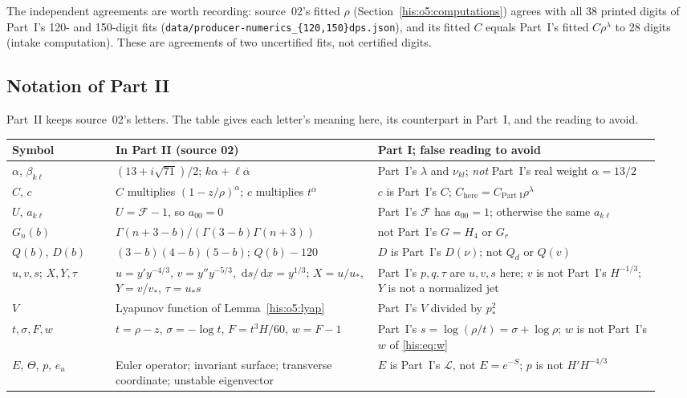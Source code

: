 \documentclass[11pt]{article}
\theoremstyle{remark}\newtheorem{remark}[theorem]{Remark}
\newcommand{\dd}{\,\mathrm d}
\newcommand{\la}{\lambda}
\numberwithin{equation}{section}
\begin{document}
The independent agreements are worth recording: source~02's fitted $\rho$ (Section~\ref{his:o5:computations}) agrees with all 38 printed digits of Part~I's 120- and 150-digit fits (\texttt{data/producer-numerics\_\{120,150\}dps.json}), and its fitted $C$ equals Part~I's fitted $C\rho^\la$ to 28 digits (intake computation). These are agreements of two uncertified fits, not certified digits.

\subsection{Notation of Part II}\label{his:o5:sec:notation}
Part~II keeps source~02's letters. The table gives each letter's meaning here, its counterpart in Part~I, and the reading to avoid.
\begin{center}\footnotesize
\begin{tabular}{@{}>{\raggedright\arraybackslash}p{0.15\linewidth}>{\raggedright\arraybackslash}p{0.38\linewidth}>{\raggedright\arraybackslash}p{0.41\linewidth}@{}}
\toprule
Symbol & In Part II (source 02) & Part I; false reading to avoid\\
\midrule
$\alpha$, $\beta_{k\ell}$ & $(13+i\sqrt{71})/2$; $k\alpha+\ell\overline\alpha$ & Part~I's $\la$ and $\nu_{kl}$; \emph{not} Part~I's real weight $\alpha=13/2$\\
$C$, $c$ & $C$ multiplies $(1-z/\rho)^\alpha$; $c$ multiplies $t^\alpha$ & $c$ is Part~I's $C$; $C_{\text{here}}=C_{\text{Part I}}\rho^\la$\\
$U$, $a_{k\ell}$ & $U=\mathcal F-1$, so $a_{00}=0$ & Part~I's $\mathcal F$ has $a_{00}=1$; otherwise the same $a_{k\ell}$\\
$G_n(b)$ & $\Gamma(n+3-b)/(\Gamma(3-b)\Gamma(n+3))$ & not Part~I's $G=H_4$ or $G_r$\\
$Q(b)$, $D(b)$ & $(3-b)(4-b)(5-b)$; $Q(b)-120$ & $D$ is Part~I's $D(\nu)$; not $Q_d$ or $Q(v)$\\
$u,v,s$; $X,Y,\tau$ & $u=y'y^{-4/3}$, $v=y''y^{-5/3}$, $\dd s/\dd x=y^{1/3}$; $X=u/u_*$, $Y=v/v_*$, $\tau=u_*s$ & Part~I's $p,q,\tau$ are $u,v,s$ here; $v$ is not Part~I's $H^{-1/3}$; $Y$ is not a normalized jet\\
$V$ & Lyapunov function of Lemma~\ref{his:o5:lyap} & Part~I's $V$ divided by $p_*^2$\\
$t,\sigma,F,w$ & $t=\rho-z$, $\sigma=-\log t$, $F=t^3H/60$, $w=F-1$ & Part~I's $s=\log(\rho/t)=\sigma+\log\rho$; $w$ is not Part~I's $w$ of \eqref{his:eq:w}\\
$E$, $\Theta$, $p$, $e_u$ & Euler operator; invariant surface; transverse coordinate; unstable eigenvector & $E$ is Part~I's $\mathcal L$, not $E=e^{-S}$; $p$ is not $H'H^{-4/3}$\\

\end{tabular}
\end{center}
\end{document}
